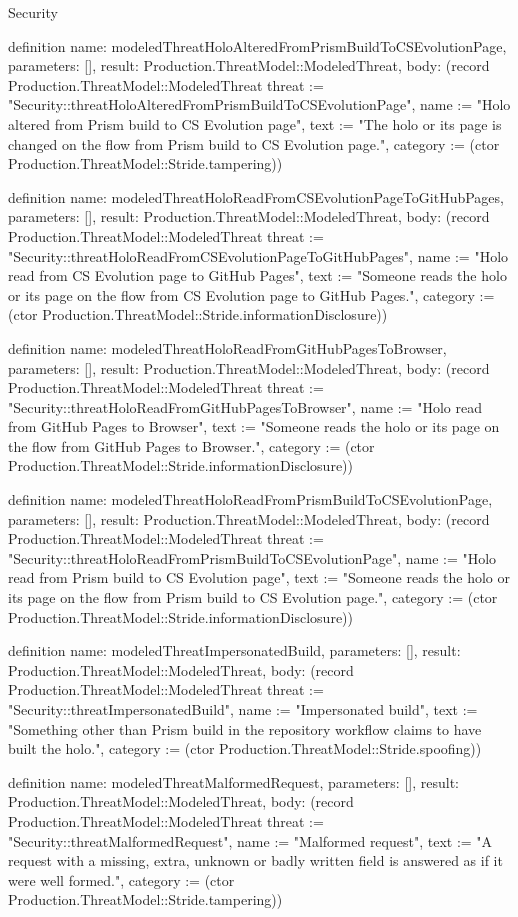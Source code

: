 \begin{lexlean}{Security}
\begin{semanticmodule}
definition{
  name: modeledThreatHoloAlteredFromPrismBuildToCSEvolutionPage,
  parameters: [],
  result: Production.ThreatModel::ModeledThreat,
  body: (record Production.ThreatModel::ModeledThreat {threat := "Security::threatHoloAlteredFromPrismBuildToCSEvolutionPage", name := "Holo altered from Prism build to CS Evolution page", text := "The holo or its page is changed on the flow from Prism build to CS Evolution page.", category := (ctor Production.ThreatModel::Stride.tampering)})
}

definition{
  name: modeledThreatHoloReadFromCSEvolutionPageToGitHubPages,
  parameters: [],
  result: Production.ThreatModel::ModeledThreat,
  body: (record Production.ThreatModel::ModeledThreat {threat := "Security::threatHoloReadFromCSEvolutionPageToGitHubPages", name := "Holo read from CS Evolution page to GitHub Pages", text := "Someone reads the holo or its page on the flow from CS Evolution page to GitHub Pages.", category := (ctor Production.ThreatModel::Stride.informationDisclosure)})
}

definition{
  name: modeledThreatHoloReadFromGitHubPagesToBrowser,
  parameters: [],
  result: Production.ThreatModel::ModeledThreat,
  body: (record Production.ThreatModel::ModeledThreat {threat := "Security::threatHoloReadFromGitHubPagesToBrowser", name := "Holo read from GitHub Pages to Browser", text := "Someone reads the holo or its page on the flow from GitHub Pages to Browser.", category := (ctor Production.ThreatModel::Stride.informationDisclosure)})
}

definition{
  name: modeledThreatHoloReadFromPrismBuildToCSEvolutionPage,
  parameters: [],
  result: Production.ThreatModel::ModeledThreat,
  body: (record Production.ThreatModel::ModeledThreat {threat := "Security::threatHoloReadFromPrismBuildToCSEvolutionPage", name := "Holo read from Prism build to CS Evolution page", text := "Someone reads the holo or its page on the flow from Prism build to CS Evolution page.", category := (ctor Production.ThreatModel::Stride.informationDisclosure)})
}

definition{
  name: modeledThreatImpersonatedBuild,
  parameters: [],
  result: Production.ThreatModel::ModeledThreat,
  body: (record Production.ThreatModel::ModeledThreat {threat := "Security::threatImpersonatedBuild", name := "Impersonated build", text := "Something other than Prism build in the repository workflow claims to have built the holo.", category := (ctor Production.ThreatModel::Stride.spoofing)})
}

definition{
  name: modeledThreatMalformedRequest,
  parameters: [],
  result: Production.ThreatModel::ModeledThreat,
  body: (record Production.ThreatModel::ModeledThreat {threat := "Security::threatMalformedRequest", name := "Malformed request", text := "A request with a missing, extra, unknown or badly written field is answered as if it were well formed.", category := (ctor Production.ThreatModel::Stride.tampering)})
}


\end{semanticmodule}
\end{lexlean}
